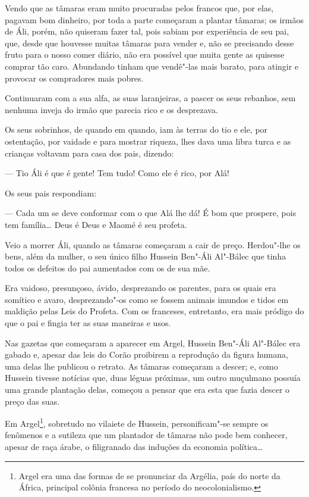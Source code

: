 Vendo que as tâmaras eram muito procuradas pelos francos que, por elas,
pagavam bom dinheiro, por toda a parte começaram a plantar tâmaras; os
irmãos de Áli, porém, não quiseram fazer tal, pois sabiam por
experiência de seu pai, que, desde que houvesse muitas tâmaras para
vender e, não se precisando desse fruto para o nosso comer diário, não
era possível que muita gente as quisesse comprar tão caro. Abundando
tinham que vendê"-las mais barato, para atingir e provocar os compradores
mais pobres.

Continuaram com a sua alfa, as suas laranjeiras, a pascer os seus
rebanhos, sem nenhuma inveja do irmão que parecia rico e os desprezava.

Os seus sobrinhos, de quando em quando, iam às terras do tio e ele, por
ostentação, por vaidade e para mostrar riqueza, lhes dava uma libra
turca e as crianças voltavam para casa dos pais, dizendo:

--- Tio Áli é que é gente! Tem tudo! Como ele é rico, por Alá!

Os seus pais respondiam:

--- Cada um se deve conformar com o que Alá lhe dá! É bom que prospere,
pois tem família\ldots{} Deus é Deus e Maomé é seu profeta.

Veio a morrer Áli, quando as tâmaras começaram a cair de preço.
Herdou"-lhe os bens, além da mulher, o seu único filho Hussein Ben"-Áli
Al"-Bálec que tinha todos os defeitos do pai aumentados com os de sua
mãe.

Era vaidoso, presunçoso, ávido, desprezando os parentes, para os quais
era somítico e avaro, desprezando"-os como se fossem animais imundos e
tidos em maldição pelas Leis do Profeta. Com os franceses, entretanto,
era mais pródigo do que o pai e fingia ter as suas maneiras e usos.

Nas gazetas que começaram a aparecer em Argel, Hussein Ben"-Áli Al"-Bálec
era gabado e, apesar das leis do Corão proibirem a reprodução da figura
humana, uma delas lhe publicou o retrato. As tâmaras começaram a descer;
e, como Hussein tivesse notícias que, duas léguas próximas, um outro
muçulmano possuía uma grande plantação delas, começou a pensar que era
esta que fazia descer o preço das suas.

Em Argel\footnote{Argel era uma das formas de se pronunciar da Argélia,
  país do norte da África, principal colônia francesa no período do
  neocolonialismo.}, sobretudo no vilaiete de Hussein, personificam"-se
sempre os fenômenos e a sutileza que um plantador de tâmaras não pode
bem conhecer, apesar de raça árabe, o filigranado das induções da
economia política\ldots{}

